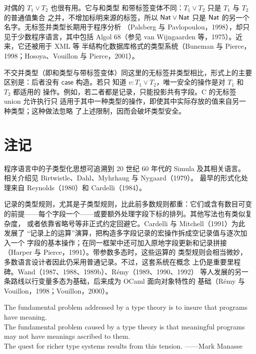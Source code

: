
对偶的 \(T_1\vee T_2\) 也很有用。它与和类型
和带标签变体不同：\(T_1\vee T_2\) 只是 \(T_1\) 与 \(T_2\) 的普通值集合
之并，不增加标明来源的标签，所以 \(\mathsf{Nat}\vee\mathsf{Nat}\)
只是 \(\mathsf{Nat}\) 的另一个名字。无标签并类型长期用于程序分析
（Palsberg 与 Pavlopoulou，1998），却只见于少数程序语言，其中包括
Algol 68（参见 van Wijngaarden 等，1975）。近来，它还被用于 XML 等
半结构化数据库格式的类型系统（Buneman 与 Pierce，1998；Hosoya、Vouillon
与 Pierce，2001）。

不交并类型（即和类型与带标签变体）同这里的无标签并类型相比，形式上的主要
区别是：后者没有 \(\mathsf{case}\) 构造。若只
知道 \(v:T_1\vee T_2\)，唯一安全的操作是对 \(T_1\) 和 \(T_2\) 都适用的
操作。例如，若二者都是记录，只能投影共有字段。C 的无标签 union 允许执行只
适用于其中一种类型的操作，即使其中实际存放的值来自另一种类型；这种做法忽略
了上述限制，因而会破坏类型安全。

\section{注记}
\label{sec:15.8}

程序语言中的子类型化思想可追溯到 20 世纪 60 年代的 Simula 及其相关语言。
相关介绍见 Birtwistle、Dahl、Myhrhaug 与 Nygaard（1979）。
最早的形式化处理来自 Reynolds（1980）和 Cardelli（1984）。

记录的类型规则，尤其是子类型规则，比此前多数规则都重：它们或含有数目可变
的前提——每个字段一个——或要额外处理字段下标的排列。其他写法也有类似复杂度，
或者依靠省略号等非正式约定回避它。Cardelli 与 Mitchell（1991）为此发展了
“记录上的运算”演算，把构造多字段记录的宏操作拆成空记录值与逐次加入一个
字段的基本操作；在同一框架中还可加入原地字段更新和记录拼接（Harper 与
Pierce，1991）。带参数多态时，这些运算的
类型规则会相当微妙，多数语言设计者因此仍采用普通记录。不过，这套系统在概念
上仍是重要里程碑。Wand（1987、1988、1989b）、R\'emy（1989、1990、1992）
等人发展的另一条路线以行变量多态为基础，后来成为 OCaml 面向对象特性的
基础（R\'emy 与 Vouillon，1998；Vouillon，2000）。

  {The fundamental problem addressed by a type theory is to insure that programs have meaning.\\
   The fundamental problem caused by a type theory is that meaningful programs may not have meanings ascribed to them.\\
   The quest for richer type systems results from this tension.}
  {——Mark Manasse}
